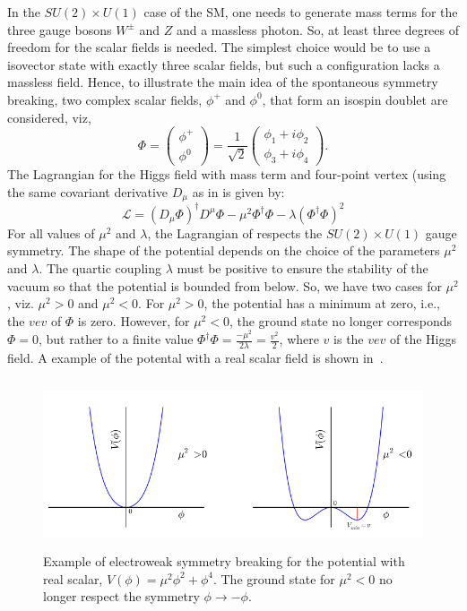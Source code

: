 In the $SU(2)\times U(1)$ case of the SM, one needs to generate mass terms for the three gauge bosons $W^{\pm}$ and $Z$ and a massless photon. 
So, at least three degrees of freedom for the scalar fields is needed. The simplest choice would be to use a isovector state with exactly three 
scalar fields, but such a configuration lacks a massless field. Hence, to illustrate the main idea of the spontaneous symmetry breaking, two 
complex scalar fields, $\phi^{+}$ and $\phi^{0}$, that form an isospin doublet are considered, viz,
\begin{equation}
\Phi = \left(\begin{array}{c} \phi^{+} \\ \phi^{0} \end{array}\right) = \frac{1}{\sqrt{2}} 
 \left(\begin{array}{c} \phi_{1} + i\phi_{2} \\ \phi_{3} + i\phi_{4}  \end{array}\right).
\end{equation}
The Lagrangian for the Higgs field with mass term and four-point vertex (using the same covariant derivative $D_{\mu}$ as in \eqn{\ref{eq:CovDer}} 
is given by:
\begin{equation}
\mathcal{L} = (D_{\mu}\Phi)^{\dag}D^{\mu}\Phi - \mu^{2}\Phi^{\dag}\Phi - \lambda(\Phi^{\dag}\Phi)^{2}
\label{eq:HiggsLag}
\end{equation}
For all values of $\mu^{2}$ and $\lambda$, the Lagrangian of \eqn{\ref{eq:HiggsLag}} respects the $SU(2)\times U(1)$ gauge symmetry. 
The shape of the potential depends on the choice of the parameters $\mu^{2}$ and $\lambda$. The quartic coupling $\lambda$ must be positive 
to ensure the stability of the vacuum so that the potential is bounded from below. So, we have two cases for $\mu^{2}$, viz. $\mu^{2}>0$ and 
$\mu^{2}<0$. For $\mu^{2}>0$, the potential has a minimum at zero, i.e., the $vev$ of $\Phi$ is zero. However, for $\mu^{2}<0$, the ground state 
no longer corresponds $\Phi=0$, but rather to a finite value $\Phi^{\dag}\Phi=\frac{-\mu^{2}}{2\lambda}=\frac{v^{2}}{2}$, where $v$ is the $vev$ of the Higgs field. 
A example of the potental with a real scalar field is shown in~\fig{\ref{fig:HiggsPotential}}.
\begin{figure}[h]
\centering
\includegraphics[width=13cm,height=5cm]{ch1/figures/HiggsPotential.png}
\caption{Example of electroweak symmetry breaking for the potential with real scalar, $V(\phi)=\mu^{2}\phi^{2} + \phi^{4}$. The ground state
for $\mu^{2}<0$ no longer respect the symmetry $\phi\to-\phi$.}
\label{fig:HiggsPotential}
\end{figure}

